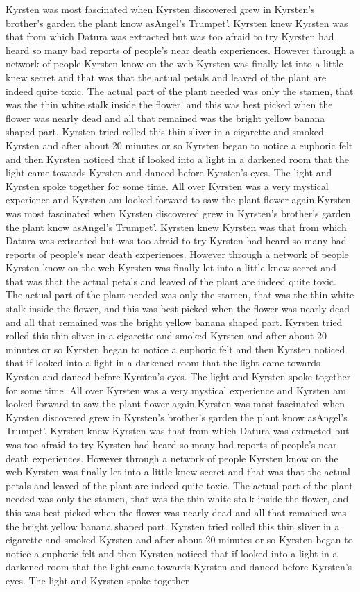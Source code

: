 \documentclass[12pt]{book}
\begin{document}
Kyrsten was most fascinated when Kyrsten discovered grew in Kyrsten's brother's garden the plant know asAngel's Trumpet'. Kyrsten knew Kyrsten was that from which Datura was extracted but was too afraid to try Kyrsten had heard so many bad reports of people's near death experiences. However through a network of people Kyrsten know on the web Kyrsten was finally let into a little knew secret and that was that the actual petals and leaved of the plant are indeed quite toxic. The actual part of the plant needed was only the stamen, that was the thin white stalk inside the flower, and this was best picked when the flower was nearly dead and all that remained was the bright yellow banana shaped part. Kyrsten tried rolled this thin sliver in a cigarette and smoked Kyrsten and after about 20 minutes or so Kyrsten began to notice a euphoric felt and then Kyrsten noticed that if looked into a light in a darkened room that the light came towards Kyrsten and danced before Kyrsten's eyes. The light and Kyrsten spoke together for some time. All over Kyrsten was a very mystical experience and Kyrsten am looked forward to saw the plant flower again.Kyrsten was most fascinated when Kyrsten discovered grew in Kyrsten's brother's garden the plant know asAngel's Trumpet'. Kyrsten knew Kyrsten was that from which Datura was extracted but was too afraid to try Kyrsten had heard so many bad reports of people's near death experiences. However through a network of people Kyrsten know on the web Kyrsten was finally let into a little knew secret and that was that the actual petals and leaved of the plant are indeed quite toxic. The actual part of the plant needed was only the stamen, that was the thin white stalk inside the flower, and this was best picked when the flower was nearly dead and all that remained was the bright yellow banana shaped part. Kyrsten tried rolled this thin sliver in a cigarette and smoked Kyrsten and after about 20 minutes or so Kyrsten began to notice a euphoric felt and then Kyrsten noticed that if looked into a light in a darkened room that the light came towards Kyrsten and danced before Kyrsten's eyes. The light and Kyrsten spoke together for some time. All over Kyrsten was a very mystical experience and Kyrsten am looked forward to saw the plant flower again.Kyrsten was most fascinated when Kyrsten discovered grew in Kyrsten's brother's garden the plant know asAngel's Trumpet'. Kyrsten knew Kyrsten was that from which Datura was extracted but was too afraid to try Kyrsten had heard so many bad reports of people's near death experiences. However through a network of people Kyrsten know on the web Kyrsten was finally let into a little knew secret and that was that the actual petals and leaved of the plant are indeed quite toxic. The actual part of the plant needed was only the stamen, that was the thin white stalk inside the flower, and this was best picked when the flower was nearly dead and all that remained was the bright yellow banana shaped part. Kyrsten tried rolled this thin sliver in a cigarette and smoked Kyrsten and after about 20 minutes or so Kyrsten began to notice a euphoric felt and then Kyrsten noticed that if looked into a light in a darkened room that the light came towards Kyrsten and danced before Kyrsten's eyes. The light and Kyrsten spoke together 
\end{document}
